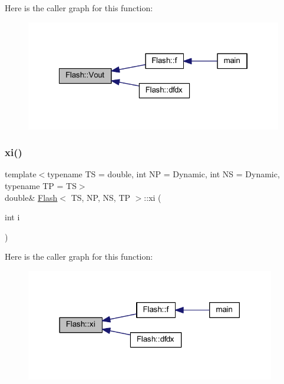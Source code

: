 Here is the caller graph for this function\+:
\nopagebreak
\begin{figure}[H]
\begin{center}
\leavevmode
\includegraphics[width=322pt]{class_flash_a14aa681b115b9ca955ab775ff5e674e0_icgraph}
\end{center}
\end{figure}
\mbox{\label{class_flash_a289586a8a31a503bd4f96ea9455f235e}} 
\subsubsection{\texorpdfstring{xi()}{xi()}}
{\footnotesize\ttfamily template$<$typename TS = double, int NP = Dynamic, int NS = Dynamic, typename TP = TS$>$ \\
double\& \mbox{\hyperlink{class_flash}{Flash}}$<$ TS, NP, NS, TP $>$\+::xi (\begin{DoxyParamCaption}\item[{int}]{i }\end{DoxyParamCaption})\hspace{0.3cm}{\ttfamily [inline]}}

Here is the caller graph for this function\+:
\nopagebreak
\begin{figure}[H]
\begin{center}
\leavevmode
\includegraphics[width=309pt]{class_flash_a289586a8a31a503bd4f96ea9455f235e_icgraph}
\end{center}
\end{figure}
\mbox{\label{class_flash_ade19a84735d622bd8fcc10bc37ed5cdd}} 
